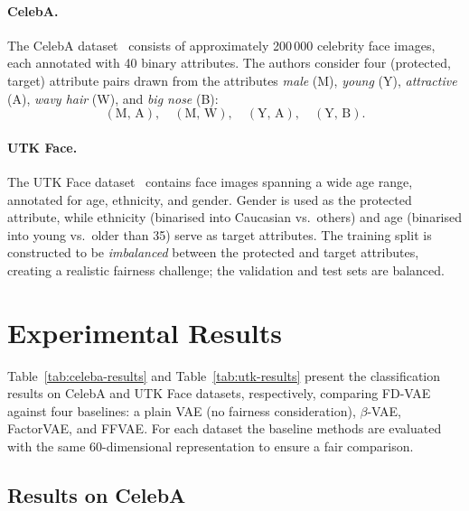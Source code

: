 \paragraph{CelebA.}
The CelebA dataset~\cite{liu2015celeba} consists of approximately 200\,000 celebrity face images,
each annotated with 40 binary attributes. The authors consider four (protected, target) attribute
pairs drawn from the attributes \textit{male} (M), \textit{young} (Y), \textit{attractive} (A),
\textit{wavy hair} (W), and \textit{big nose} (B):
\[
    (\text{M},\,\text{A}), \quad (\text{M},\,\text{W}), \quad (\text{Y},\,\text{A}), \quad (\text{Y},\,\text{B}).
\]

\paragraph{UTK Face.}
The UTK Face dataset~\cite{zhang2017utkface} contains face images spanning a wide age range,
annotated for age, ethnicity, and gender. Gender is used as the protected attribute, while ethnicity
(binarised into Caucasian vs.\ others) and age (binarised into young vs.\ older than 35) serve as
target attributes. The training split is constructed to be \emph{imbalanced} between the protected
and target attributes, creating a realistic fairness challenge; the validation and test sets are
balanced.

\section{Experimental Results}
\label{sec:readme-results}

Table~\ref{tab:celeba-results} and Table~\ref{tab:utk-results} present the classification results on
CelebA and UTK Face datasets, respectively, comparing FD-VAE against four baselines: a plain VAE
(no fairness consideration), $\beta$-VAE, FactorVAE, and FFVAE. For each dataset the baseline
methods are evaluated with the same 60-dimensional representation to ensure a fair comparison.

\subsection{Results on CelebA}

